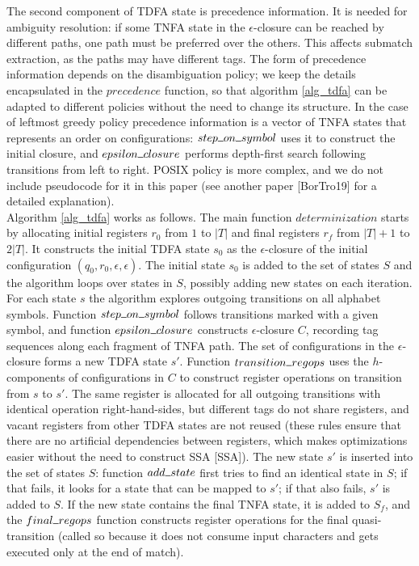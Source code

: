 \documentclass[]{article}
\newcommand{\Xund}{\rule{.5em}{.5pt}}
\begin{document}
The second component of TDFA state is precedence information.
It is needed for ambiguity resolution:
if some TNFA state in the $\epsilon$-closure can be reached by different paths, one path must be preferred over the others.
This affects submatch extraction, as the paths may have different tags.
The form of precedence information depends on the disambiguation policy;
we keep the details encapsulated in the $precedence$ function,
so that algorithm \ref{alg_tdfa} can be adapted to different policies without the need to change its structure.
%
In the case of leftmost greedy policy precedence information is a vector of TNFA states that represents an order on configurations:
$step \Xund on \Xund symbol$ uses it to construct the initial closure,
and $epsilon \Xund closure$ performs depth-first search following transitions from left to right.
%
POSIX policy is more complex, and we do not include pseudocode for it in this paper
(see another paper [BorTro19] for a detailed explanation).
\\

Algorithm \ref{alg_tdfa} works as follows.
The main function $determinization$ starts by allocating initial registers $r_0$ from $1$ to $|T|$ and final registers $r_{\!f}$ from $|T| + 1$ to $2|T|$.
It constructs the initial TDFA state $s_0$ as the $\epsilon$-closure of the initial configuration $(q_0, r_0, \epsilon, \epsilon)$.
The initial state $s_0$ is added to the set of states $S$ and the algorithm loops over states in $S$, possibly adding new states on each iteration.
For each state $s$ the algorithm explores outgoing transitions on all alphabet symbols.
Function $step \Xund on \Xund symbol$ follows transitions marked with a given symbol,
and  function $epsilon \Xund closure$ constructs $\epsilon$-closure $C$, recording tag sequences along each fragment of TNFA path.
%
The set of configurations in the $\epsilon$-closure forms a new TDFA state $s'$.
Function $transition \Xund regops$ uses the $h$-components of configurations in $C$ to construct register operations on transition from $s$ to $s'$.
%
The same register is allocated for all outgoing transitions with identical operation right-hand-sides,
but different tags do not share registers,
and vacant registers from other TDFA states are not reused
(these rules ensure that there are no artificial dependencies between registers, which makes optimizations easier without the need to construct SSA [SSA]).
%
The new state $s'$ is inserted into the set of states $S$:
function $add \Xund state$ first tries to find an identical state in $S$;
if that fails, it looks for a state that can be mapped to $s'$;
if that also fails, $s'$ is added to $S$.
%
If the new state contains the final TNFA state, it is added to $S_f$,
and the $final \Xund regops$ function constructs register operations for the final quasi-transition
(called so because it does not consume input characters and gets executed only at the end of match).
\\
\end{document}

